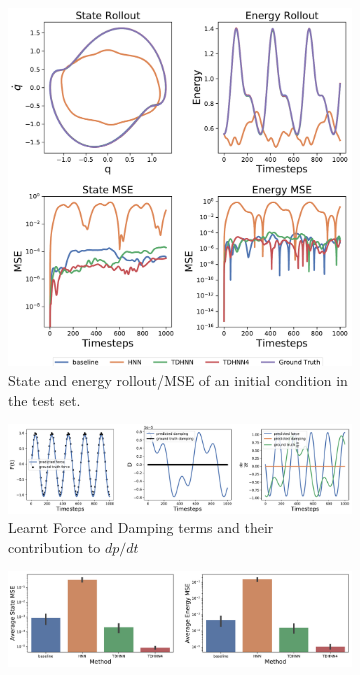 \documentclass[twoside]{article}
\begin{document}
\begin{figure}[h!]
\centering

\captionsetup{justification=centering}
	\begin{subfigure}[b]{0.4\textwidth}
		\centering
		\includegraphics[width=\textwidth]{figures/forced_mass_spring_1.pdf}
		\caption{State and energy rollout/MSE of an initial condition in the test set.}
	\end{subfigure}
	\begin{subfigure}[b]{0.48\textwidth}
		\centering
		\includegraphics[width=\textwidth]{figures/dpdt_forced_mass_spring_1.pdf}
		\caption{Learnt Force and Damping terms and their contribution to $dp/dt$}
	\end{subfigure}
	\begin{subfigure}[b]{0.48\textwidth}
	    \centering
		\includegraphics[width=\textwidth]{figures/mass_spring_forced_1_errors.pdf}

\end{subfigure}
\end{figure}
\end{document}
